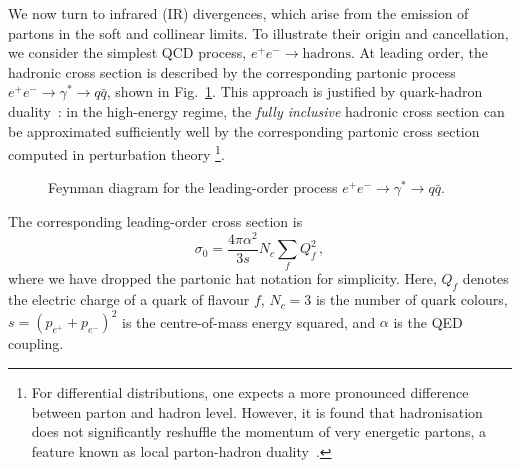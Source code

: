 We now turn to infrared (IR) divergences, which arise from the emission
of partons in the soft and collinear limits. To illustrate their
origin and cancellation, we consider the simplest QCD process,
$e^+e^- \rightarrow \mathrm{hadrons}$.  At leading order, the hadronic
cross section is described by the corresponding partonic process
$e^+e^- \rightarrow \gamma^* \rightarrow q\bar{q}$, shown in
Fig.~\ref{fig:photon-qq}. This approach is
justified by quark-hadron duality~\cite{Poggio:1975af}: in the high-energy regime, the \emph{fully inclusive} hadronic cross
section can be approximated sufficiently well by the corresponding partonic cross
section computed in perturbation theory \footnote{For differential distributions, one expects a more pronounced difference between parton and hadron level. However, it is found that hadronisation does not significantly reshuffle the momentum of very energetic partons, a feature known as local parton-hadron duality~\cite{Shifman:2000jv, Azimov:1984np}.}.
\begin{figure}[h]
    \centering
\caption{Feynman diagram for the leading-order process \(e^+e^-\to\gamma^* \to q\bar{q}\).}
    \label{fig:photon-qq}
\end{figure}

The corresponding leading-order cross section is
\begin{equation}
\label{eq:sigma-LO}
	\sigma_0=\frac{4\pi\alpha^2}{3s}N_c\sum_fQ_f^2\,,
\end{equation}
where we have dropped the partonic hat notation for simplicity. Here, $Q_f$
denotes the electric charge of a quark of flavour $f$, $N_c=3$ is the number
of quark colours, $s=(p_{e^+}+p_{e^-})^2$ is the centre-of-mass energy squared,
and $\alpha$ is the QED coupling.

